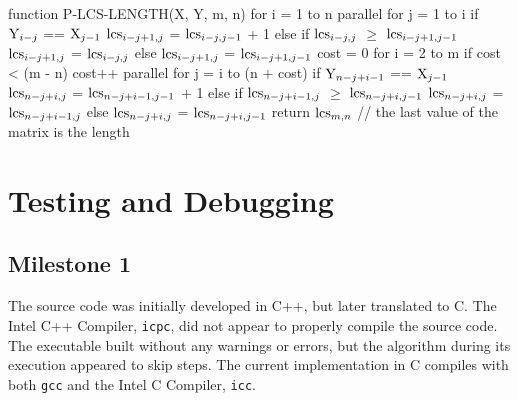 \documentclass[usletter, 11pt]{extarticle}
\newcommand{\V}[1]{\textup{#1}}
\newcommand{\lcs}{\V{lcs}}
\newcommand{\seqone}{\V{X}}
\newcommand{\seqtwo}{\V{Y}}
\begin{document}
\begin{pseudocode}[caption={Parallel Longest Common Subsequence Length},
label={alg4}]
function P-LCS-LENGTH(X, Y, m, n)
    for i = 1 to n
        parallel for j = 1 to i
            if $\seqtwo_{i - j}$ == $\seqone_{j - 1}$
                $\lcs_{i - j + 1, j}$ = $\lcs_{i - j, j - 1}$ + 1
            else if $\lcs_{i - j, j}$ $\ge$ $\lcs_{i - j + 1, j - 1}$
                $\lcs_{i - j + 1, j}$ = $\lcs_{i - j, j}$
            else
                $\lcs_{i - j + 1, j}$ = $\lcs_{i - j + 1, j - 1}$
    cost = 0
    for i = 2 to m
        if cost < (m - n)
            cost++
        parallel for j = i to (n + cost)
            if $\seqtwo_{n - j + i - 1}$ == $\seqone_{j - 1}$
                $\lcs_{n - j + i, j}$ = $\lcs_{n - j + i - 1, j - 1}$ + 1
            else if $\lcs_{n - j + i - 1, j}$ $\ge$ $\lcs_{n - j + i, j - 1}$
                $\lcs_{n - j + i, j}$ = $\lcs_{n - j + i - 1, j}$
            else
                $\lcs_{n - j + i, j}$ = $\lcs_{n - j + i, j - 1}$
    return $\lcs_{m,n}$  // the last value of the matrix is the length

\end{pseudocode}

    \section{Testing and Debugging} 

        \subsection{Milestone 1} The source code was initially developed in
        C++, but later translated to C. The Intel C++ Compiler, \texttt{icpc},
        did not appear to properly compile the source code. The executable
        built without any warnings or errors, but the algorithm during its
        execution appeared to skip steps. The current implementation in C
        compiles with both \texttt{gcc} and the Intel C Compiler, \texttt{icc}.

    
\end{document}
